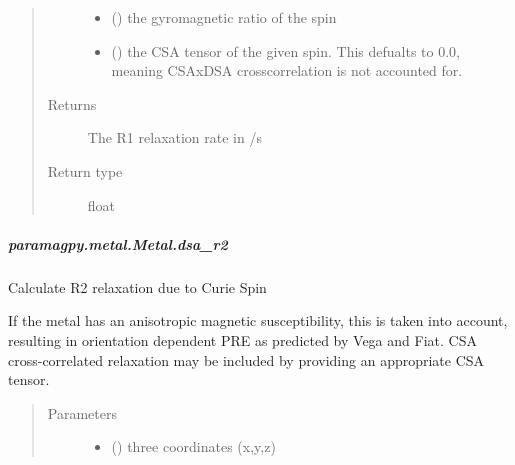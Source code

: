 \documentclass[a4paper,10pt,english,openany,oneside]{sphinxmanual}
\begin{document}
\begin{fulllineitems}
\begin{fulllineitems}
\begin{fulllineitems}
\begin{quote}
\begin{description}
\begin{itemize}
\item {} 
 () \textendash{} the gyromagnetic ratio of the spin

\item {} 
 (\sphinxstyleliteralemphasis{\sphinxupquote{ (}}\sphinxstyleliteralemphasis{\sphinxupquote{)}}) \textendash{} the CSA tensor of the given spin.
This defualts to 0.0, meaning CSAxDSA crosscorrelation is
not accounted for.

\end{itemize}

\item[{Returns}] \leavevmode
{} \textendash{} The R1 relaxation rate in /s

\item[{Return type}] \leavevmode
float

\end{description}\end{quote}

\end{fulllineitems}



\subparagraph{paramagpy.metal.Metal.dsa\_r2}
\label{\detokenize{reference/generated/paramagpy.metal.Metal.dsa_r2:paramagpy-metal-metal-dsa-r2}}\label{\detokenize{reference/generated/paramagpy.metal.Metal.dsa_r2::doc}}

\begin{fulllineitems}
\label{\detokenize{reference/generated/paramagpy.metal.Metal.dsa_r2:paramagpy.metal.Metal.dsa_r2}}
Calculate R2 relaxation due to Curie Spin

If the metal has an anisotropic magnetic susceptibility, this is
taken into account, resulting in orientation dependent PRE as
predicted by Vega and Fiat. CSA cross-correlated relaxation may
be included by providing an appropriate CSA tensor.
\begin{quote}\begin{description}
\item[{Parameters}] \leavevmode\begin{itemize}
\item {} 
 () \textendash{} three coordinates (x,y,z)


\end{itemize}
\end{description}
\end{quote}
\end{fulllineitems}
\end{fulllineitems}
\end{fulllineitems}
\end{document}
